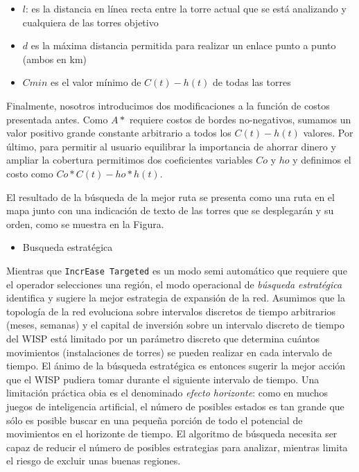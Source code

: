 \documentclass[]{article}
\providecommand{\tightlist}{%
  \setlength{\itemsep}{0pt}\setlength{\parskip}{0pt}}
\begin{document}
\begin{itemize}
\item
  \(l\): es la distancia en línea recta entre la torre actual que se
  está analizando y cualquiera de las torres objetivo
\item
  \(d\) es la máxima distancia permitida para realizar un enlace punto a
  punto (ambos en km)
\item
  \(Cmin\) es el valor mínimo de \(C(t)-h(t)\) de todas las torres
\end{itemize}

Finalmente, nosotros introducimos dos modificaciones a la función de
costos presentada antes. Como \(A*\) requiere costos de bordes
no-negativos, sumamos un valor positivo grande constante arbitrario a
todos los \(C(t)-h(t)\) valores. Por último, para permitir al usuario
equilibrar la importancia de ahorrar dinero y ampliar la cobertura
permitimos dos coeficientes variables \(Co\) y \(ho\) y definimos el
costo como \(Co*C(t)-ho*h(t)\).

El resultado de la búsqueda de la mejor ruta se presenta como una ruta
en el mapa junto con una indicación de texto de las torres que se
desplegarán y su orden, como se muestra en la Figura.

\begin{itemize}
\tightlist
\item
  Busqueda estratégica
\end{itemize}

Mientras que \texttt{IncrEase\ Targeted} es un modo semi automático que
requiere que el operador selecciones una región, el modo operacional de
\emph{búsqueda estratégica} identifica y sugiere la mejor estrategia de
expansión de la red. Asumimos que la topología de la red evoluciona
sobre intervalos discretos de tiempo arbitrarios (meses, semanas) y el
capital de inversión sobre un intervalo discreto de tiempo del WISP está
limitado por un parámetro discreto que determina cuántos movimientos
(instalaciones de torres) se pueden realizar en cada intervalo de
tiempo. El ánimo de la búsqueda estratégica es entonces sugerir la mejor
acción que el WISP pudiera tomar durante el siguiente intervalo de
tiempo. Una limitación práctica obia es el denominado \emph{efecto
horizonte}: como en muchos juegos de inteligencia artificial, el número
de posibles estados es tan grande que sólo es posible buscar en una
pequeña porción de todo el potencial de movimientos en el horizonte de
tiempo. El algoritmo de búsqueda necesita ser capaz de reducir el número
de posibles estrategias para analizar, mientras limita el riesgo de
excluir unas buenas regiones.
\end{document}
